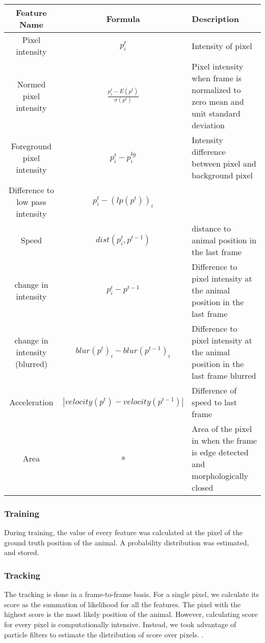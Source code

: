 \begin{table}
    \begin{tabular}{|c|c|p{3cm}|}
        \hline
        \textbf{Feature Name} & \textbf{Formula} & \textbf{Description} \\ \hline
        Pixel intensity & $p_i^t$ & Intensity of pixel \\ \hline
        Normed pixel intensity & $\displaystyle \frac{p_i^t - E(p^t)}{\sigma(p^t)}$ & Pixel intensity when frame is normalized to zero mean and unit standard deviation \\ \hline
        Foreground pixel intensity & $p_i^t - p_i^{bg} $ & Intensity difference between pixel and background pixel \\ \hline
        Difference to low pass intensity & $p_i^t - (lp(p^t))_i$ & \\ \hline
        Speed & $dist(p_i^t, p^{t-1})$ & distance to animal position in the last frame \\ \hline
        change in intensity & $p_i^t - p^{t-1}$ & Difference to pixel intensity at the animal position in the last frame \\ \hline
        change in intensity (blurred) & $blur(p^t)_i - blur(p^{t-1})_i$& Difference to pixel intensity at the animal position in the last frame blurred \\ \hline
        Acceleration &$ |velocity(p^t) - velocity(p^{t-1})|$& Difference of speed to last frame \\ \hline
        Area & $s$ & Area of the pixel in when the frame is edge detected and morphologically closed \\ \hline
    \end{tabular}
\end{table}

\subsubsection{Training}
During training, the value of every feature was calculated at the pixel of the ground truth position of the animal. A probability distribution was estimated, and stored. 

\subsubsection{Tracking}
The tracking is done in a frame-to-frame basis. For a single pixel, we calculate its score as the summation of likelihood for all the features. The pixel with the highest score is the most likely position of the animal. However, calculating score for every pixel is computationally intensive. Instead, we took advantage of particle filters to estimate the distribution of score over pixels. .

